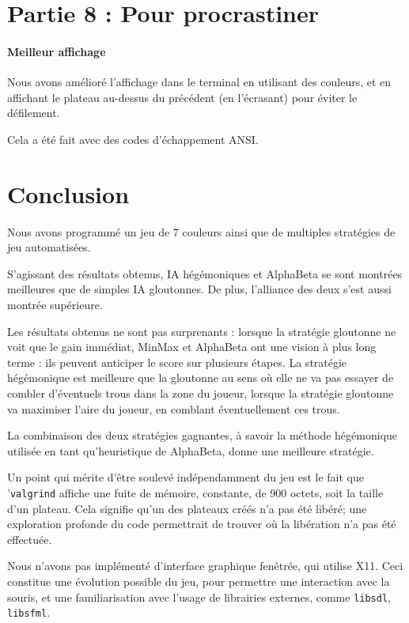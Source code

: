 \documentclass[a4paper]{article}
\begin{document}
    \section{Partie 8 : Pour procrastiner}
    \paragraph{Meilleur affichage} Nous avons amélioré l'affichage dans le
    terminal en utilisant des couleurs, et en affichant le plateau au-dessus du
    précédent (en l'écrasant) pour éviter le défilement. 
    
    Cela a été fait avec des codes d'échappement ANSI.

    \section{Conclusion}
    Nous avons programmé un jeu de 7 couleurs ainsi que de multiples stratégies 
de jeu automatisées. 
    
    S'agissant des résultats obtenus, IA hégémoniques et AlphaBeta 
se sont montrées meilleures que de simples IA gloutonnes. De plus, l'alliance 
des deux s'est aussi montrée supérieure.

Les résultats obtenus ne sont pas surprenants : lorsque la stratégie gloutonne 
ne voit que le gain immédiat, MinMax et AlphaBeta ont une vision à plus long 
terme : ils peuvent anticiper le score sur plusieurs étapes. La stratégie 
hégémonique est meilleure que la gloutonne au sens où elle ne va pas essayer de 
combler d'éventuels trous dans la zone du joueur, lorsque la stratégie 
gloutonne va maximiser l'aire du joueur, en comblant éventuellement ces trous.

La combinaison des deux stratégies gagnantes, à savoir la méthode hégémonique 
utilisée en tant qu'heuristique de AlphaBeta, donne une meilleure stratégie.

Un point qui mérite d'être soulevé indépendamment du jeu est 
le fait que '\texttt{valgrind} affiche une fuite de mémoire, constante, de 900 
octets, soit la taille d'un plateau. Cela signifie qu'un des plateaux créés n'a 
pas été libéré; une exploration profonde du code permettrait de trouver où la 
libération n'a pas été effectuée.

Nous n'avons pas implémenté d'interface graphique fenêtrée, qui utilise X11. 
Ceci constitue une évolution possible du jeu, pour permettre une interaction 
avec la souris, et une familiarisation avec l'usage de librairies externes, 
comme \texttt{libsdl}, \texttt{libsfml}.

    
\end{document}
